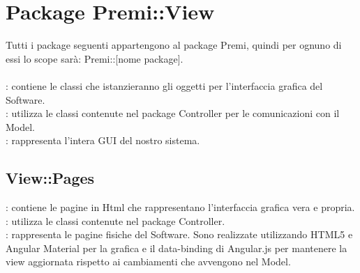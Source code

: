\section{Package Premi::View}{
	Tutti i package seguenti appartengono al package Premi, quindi per ognuno di essi lo scope sarà: Premi::[nome package]. \\\\
	\textbf{\tipo}: contiene le classi che istanzieranno gli oggetti per l'interfaccia grafica del Software.\\
	\textbf{\relaz}: utilizza le classi contenute nel package Controller per le comunicazioni con il Model.\\
	\textbf{\attivita}: rappresenta l'intera GUI del nostro sistema.
\subsection{View::Pages}{
\textbf{\tipo}: contiene le pagine in Html che rappresentano l'interfaccia grafica vera e propria.\\
\textbf{\relaz}: utilizza le classi contenute nel package Controller.\\
\textbf{\attivita}: rappresenta le pagine fisiche del Software. Sono realizzate utilizzando HTML5 e Angular Material per la grafica e il data-binding di Angular.js per mantenere la view aggiornata rispetto ai cambiamenti che avvengono nel Model.
}
}
